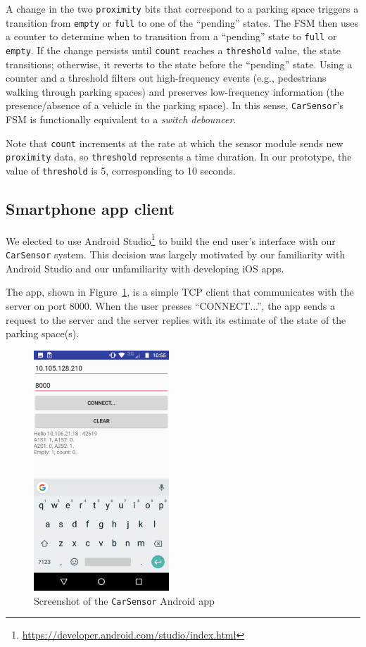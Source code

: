 \documentclass[conference]{IEEEtran}
\begin{document}
A change in the two \texttt{proximity} bits that correspond to a parking space triggers a transition from \texttt{empty} or \texttt{full} to one of the ``pending'' states. The FSM then uses a counter to determine when to transition from a ``pending'' state to \texttt{full} or \texttt{empty}. If the change persists until \texttt{count} reaches a \texttt{threshold} value, the state transitions; otherwise, it reverts to the state before the ``pending'' state. Using a counter and a threshold filters out high-frequency events (e.g., pedestrians walking through parking spaces) and preserves low-frequency information (the presence/absence of a vehicle in the parking space). In this sense, \texttt{CarSensor}'s FSM is functionally equivalent to a \textit{switch debouncer}.

Note that \texttt{count} increments at the rate at which the sensor module sends new \texttt{proximity} data, so \texttt{threshold} represents a time duration. In our prototype, the value of \texttt{threshold} is 5, corresponding to 10 seconds.
\subsection{Smartphone app client}
We elected to use Android Studio\footnote{\url{https://developer.android.com/studio/index.html}} to build the end user's interface with our \texttt{CarSensor} system. This decision was largely motivated by our familiarity with Android Studio and our unfamiliarity with developing iOS apps.

The app, shown in Figure~\ref{fig_app}, is a simple TCP client that communicates with the server on port 8000. When the user presses ``CONNECT...'', the app sends a request to the server and the server replies with its estimate of the state of the parking space(s).

\begin{figure}[h]
	\centering
	\includegraphics[width=2.0in]{app.png}
	\caption{Screenshot of the \texttt{CarSensor} Android app}
	\label{fig_app}
\end{figure}
\end{document}
